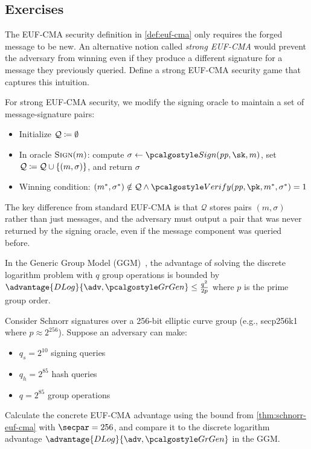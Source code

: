 \subsection{Exercises}

\begin{exercise}
  The EUF-CMA security definition in \autoref{def:euf-cma} only requires the forged message to be new. An alternative notion called \emph{strong EUF-CMA} would prevent the adversary from winning even if they produce a different signature for a message they previously queried. Define a strong EUF-CMA security game that captures this intuition.
\end{exercise}

\ifsolutions
\begin{mysolution}
  For strong EUF-CMA security, we modify the signing oracle to maintain a set of message-signature pairs:
  \begin{itemize}
    \item Initialize $\mathcal{Q} \coloneq \emptyset$
    \item In oracle ${\normalfont\textsc{Sign}}(m)$: compute $\sigma \gets \algo{Sign}(\params, \sk, m)$, set $\mathcal{Q} \coloneq \mathcal{Q} \cup \{(m, \sigma)\}$, and return $\sigma$
    \item Winning condition: $(m^*, \sigma^*) \notin \mathcal{Q} \wedge \algo{Verify}(\params, \pk, m^*, \sigma^*) = 1$
  \end{itemize}

  The key difference from standard EUF-CMA is that $\mathcal{Q}$ stores pairs $(m, \sigma)$ rather than just messages, and the adversary must output a pair that was never returned by the signing oracle, even if the message component was queried before.
\end{mysolution}
\fi


\begin{exercise}
  In the Generic Group Model (GGM)~\cite{EC:Shoup97}, the advantage of solving the discrete logarithm problem with $q$ group operations is bounded by $\advantage{DLog}{\adv, \grgen} \leq \frac{q^2}{2p}$ where $p$ is the prime group order.
  
  Consider Schnorr signatures over a 256-bit elliptic curve group (e.g., secp256k1 where $p \approx 2^{256}$). Suppose an adversary can make:
  \begin{itemize}
    \item $q_s = 2^{10}$ signing queries
    \item $q_h = 2^{85}$ hash queries
    \item $q = 2^{85}$ group operations
  \end{itemize}
  
  Calculate the concrete EUF-CMA advantage using the bound from \autoref{thm:schnorr-euf-cma} with $\secpar = 256$, and compare it to the discrete logarithm advantage $\advantage{DLog}{\adv, \grgen}$ in the GGM.
\end{exercise}

